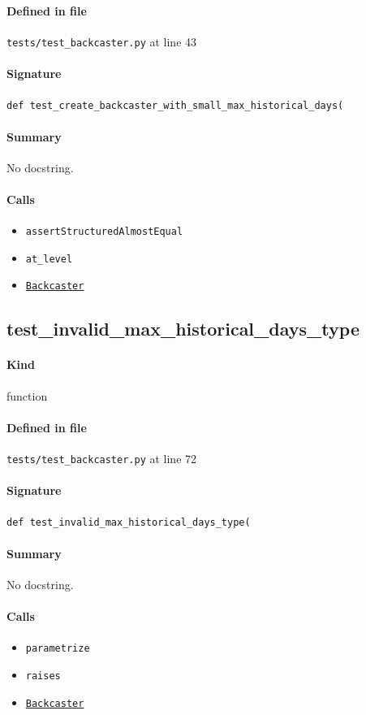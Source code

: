 \documentclass[11pt]{report}
\begin{document}
\paragraph{Defined in file} \texttt{tests/test\_backcaster.py} at line 43
\paragraph{Signature} \texttt{def test\_create\_backcaster\_with\_small\_max\_historical\_days(}
\paragraph{Summary} No docstring.
\paragraph{Calls}
\begin{itemize}[leftmargin=*]
  \item \texttt{assertStructuredAlmostEqual}
  \item \texttt{at\_level}
  \item \hyperref[def:forecaster.py:Backcaster:L321]{\texttt{Backcaster}}
\end{itemize}
\subsection{test\_invalid\_max\_historical\_days\_type}
\label{def:tests-test_backcaster.py:test_invalid_max_historical_days_type:L72}
\paragraph{Kind} function
\paragraph{Defined in file} \texttt{tests/test\_backcaster.py} at line 72
\paragraph{Signature} \texttt{def test\_invalid\_max\_historical\_days\_type(}
\paragraph{Summary} No docstring.
\paragraph{Calls}
\begin{itemize}[leftmargin=*]
  \item \texttt{parametrize}
  \item \texttt{raises}
  \item \hyperref[def:forecaster.py:Backcaster:L321]{\texttt{Backcaster}}
\end{itemize}
\end{document}
